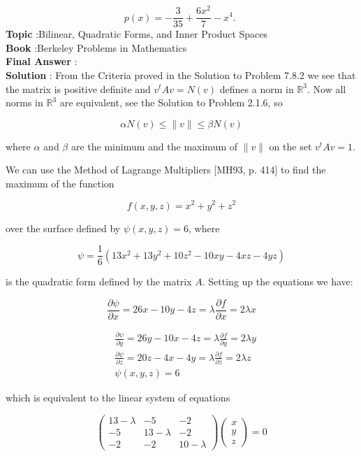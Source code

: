 \documentclass[10pt]{article}
\begin{document}
$$
p(x)=-\frac{3}{35}+\frac{6 x^{2}}{7}-x^{4} \text {. }
$$
\textbf{Topic} :Bilinear, Quadratic Forms, and Inner Product Spaces \\
\textbf{Book} :Berkeley Problems in Mathematics\\
\textbf{Final Answer} :\\


\textbf{Solution} : From the Criteria proved in the Solution to Problem 7.8.2 we see that the matrix is positive definite and $v^{t} A v=N(v)$ defines a norm in $\mathbb{R}^{3}$. Now all norms in $\mathbb{R}^{3}$ are equivalent, see the Solution to Problem 2.1.6, so

$$
\alpha N(v) \leqslant\|v\| \leqslant \beta N(v)
$$

where $\alpha$ and $\beta$ are the minimum and the maximum of $\|v\|$ on the set $v^{t} A v=1$.

We can use the Method of Lagrange Multipliers [MH93, p. 414] to find the maximum of the function

$$
f(x, y, z)=x^{2}+y^{2}+z^{2}
$$

over the surface defined by $\psi(x, y, z)=6$, where

$$
\psi=\frac{1}{6}\left(13 x^{2}+13 y^{2}+10 z^{2}-10 x y-4 x z-4 y z\right)
$$

is the quadratic form defined by the matrix $A$. Setting up the equations we have:

$$
\frac{\partial \psi}{\partial x}=26 x-10 y-4 z=\lambda \frac{\partial f}{\partial x}=2 \lambda x
$$



$$
\begin{aligned}
&\frac{\partial \psi}{\partial y}=26 y-10 x-4 z=\lambda \frac{\partial f}{\partial y}=2 \lambda y \\
&\frac{\partial \psi}{\partial z}=20 z-4 x-4 y=\lambda \frac{\partial f}{\partial z}=2 \lambda z \\
&\psi(x, y, z)=6
\end{aligned}
$$

which is equivalent to the linear system of equations

$$
\left(\begin{array}{ccc}
13-\lambda & -5 & -2 \\
-5 & 13-\lambda & -2 \\
-2 & -2 & 10-\lambda
\end{array}\right)\left(\begin{array}{l}
x \\
y \\
z
\end{array}\right)=0
$$
\end{document}
